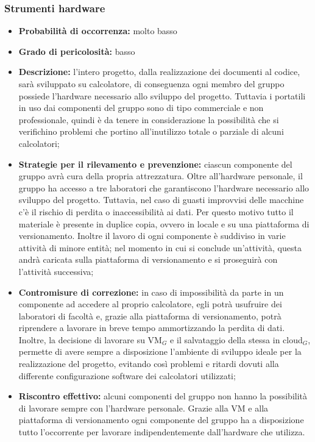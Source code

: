\subsubsection{Strumenti hardware}
\hypertarget{subsubsect:hardware}{}
\begin{itemize}
\item \textbf{Probabilità di occorrenza:} molto basso
\item \textbf{Grado di pericolosità:} basso

\item \textbf{Descrizione:} l'intero progetto, dalla realizzazione dei documenti al codice, sarà sviluppato su calcolatore, di conseguenza ogni membro del gruppo possiede l'hardware necessario allo sviluppo del progetto. Tuttavia i portatili in uso dai componenti del gruppo sono di tipo commerciale e non professionale, quindi è da tenere in considerazione la possibilità che si verifichino problemi che portino all'inutilizzo totale o parziale di alcuni calcolatori;

\item \textbf{Strategie per il rilevamento e prevenzione:} ciascun componente del gruppo avrà cura della propria attrezzatura. Oltre all'hardware personale, il gruppo ha accesso a tre laboratori che garantiscono l'hardware necessario allo sviluppo del progetto. Tuttavia, nel caso di guasti improvvisi delle macchine c'è il rischio di perdita o inaccessibilità ai dati. Per questo motivo tutto il materiale è presente in duplice copia, ovvero in locale e su una piattaforma di versionamento. Inoltre il lavoro di ogni componente è suddiviso in varie attività di minore entità; nel momento in cui si conclude un'attività, questa andrà caricata sulla piattaforma di versionamento e si proseguirà con l'attività successiva;
 
\item \textbf{Contromisure di correzione:} in caso di impossibilità da parte in un componente ad accedere al proprio calcolatore, egli potrà usufruire dei laboratori di facoltà e, grazie alla piattaforma di versionamento, potrà riprendere a lavorare in breve tempo ammortizzando la perdita di dati. Inoltre, la decisione di lavorare su VM$_G$ e il salvataggio della stessa in cloud$_G$, permette di avere sempre a disposizione l'ambiente di sviluppo ideale per la realizzazione del progetto, evitando così problemi e ritardi dovuti alla differente configurazione software dei calcolatori utilizzati;

\item \textbf{Riscontro effettivo:} alcuni componenti del gruppo non hanno la possibilità di lavorare sempre con l'hardware personale. Grazie alla VM e alla piattaforma di versionamento ogni componente del gruppo ha a disposizione tutto l'occorrente per lavorare indipendentemente dall'hardware che utilizza.
\end{itemize}

